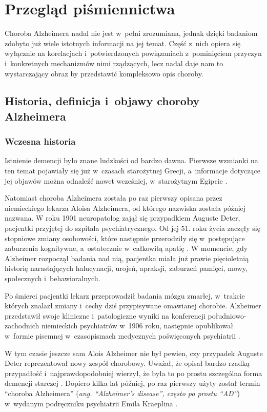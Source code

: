 \chapter{Przegląd piśmiennictwa}

Choroba Alzheimera nadal nie jest w~pełni zrozumiana, jednak dzięki badaniom zdobyto już wiele istotnych informacji na jej temat.
Część z~nich opiera się wyłącznie na korelacjach i~potwierdzonych powiązaniach z~pominięciem przyczyn i~konkretnych mechanizmów nimi rządzących, lecz nadal daje nam to wystarczający obraz by przedstawić kompleksowo opis choroby.

\section{Historia, definicja i~objawy choroby Alzheimera}

\subsection{Wczesna historia}

Istnienie demencji było znane ludzkości od bardzo dawna.
Pierwsze wzmianki na ten temat pojawiały się już w~czasach starożytnej Grecji, a~informacje dotyczące jej objawów można odnaleźć nawet wcześniej, w~starożytnym Egipcie \cite{boller1998history}.

Natomiast choroba Alzheimera została po raz pierwszy opisana przez niemieckiego lekarza Aloisa Alzheimera, od którego nazwiska została później nazwana.
W roku 1901 neuropatolog zajął się przypadkiem Auguste Deter, pacjentki przyjętej do szpitala psychiatrycznego.
Od jej 51. roku życia zaczęły się stopniowe zmiany osobowości, które następnie przerodziły się w~postępujące zaburzenia kognitywne, a~ostatecznie w~całkowitą apatię \cite{cipriani2011alzheimer}.
W momencie, gdy Alzheimer rozpoczął badania nad nią, pacjentka miała już prawie pięcioletnią historię narastających halucynacji, urojeń, apraksji, zaburzeń pamięci, mowy, społecznych i~behawioralnych.

Po śmierci pacjentki lekarz przeprowadził badania mózgu zmarłej, w~trakcie których znalazł zmiany i~cechy dziś przypisywane omawianej chorobie.
Alzheimer przedstawił swoje kliniczne i~patologiczne wyniki na konferencji południowo-zachodnich niemieckich psychiatrów w~1906 roku, następnie opublikował w~formie pisemnej w~czasopismach medycznych poświęconych psychiatrii \cite{alzheimer1906uber}.

W tym czasie jeszcze sam Alois Alzheimer nie był pewien, czy przypadek Auguste Deter reprezentował nowy zespół chorobowy.
Uważał, że opisał bardzo rzadką przypadłość i~najprawdopodobniej wierzył, że była to po prostu szczególna forma demencji starczej \cite{cipriani2011alzheimer}.
Dopiero kilka lat później, po raz pierwszy użyty został termin ``choroba Alzheimera'' (\emph{ang. ``Alzheimer's disease'', często po prostu ``AD''}) w~wydanym podręczniku psychiatrii Emila Kraeplina \cite{kraepelin1910psychiatrie}.

